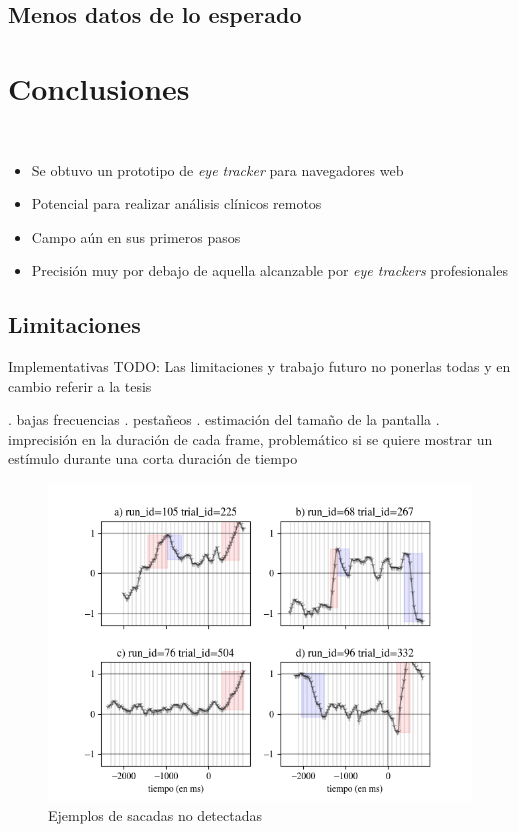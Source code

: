 \documentclass[aspectratio=169]{beamer}
\begin{document}
\subsection{Menos datos de lo esperado}



\section{Conclusiones}

\begin{frame}{~}
  \begin{itemize}
    \item Se obtuvo un prototipo de \textit{eye tracker} para navegadores web
    \item Potencial para realizar análisis clínicos remotos
    \item Campo aún en sus primeros pasos
    \item Precisión muy por debajo de aquella alcanzable por \textit{eye
      trackers} profesionales
  \end{itemize}
\end{frame}

\subsection{Limitaciones}

\begin{frame}{Implementativas}
  TODO: Las limitaciones y trabajo futuro no ponerlas todas y en cambio referir
  a la tesis \par

. bajas frecuencias
. pestañeos
. estimación del tamaño de la pantalla
. imprecisión en la duración de cada frame, problemático si se quiere mostrar
  un estímulo durante una corta duración de tiempo

  \begin{figure}
    \centering
    \includegraphics[width=0.9\linewidth]{img/undetected-saccades-examples.png}
    \caption{Ejemplos de sacadas no detectadas}
  \end{figure}
\end{frame}
\end{document}
